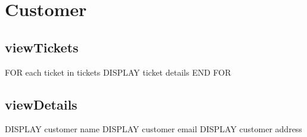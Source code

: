 \section{Customer}

\subsection{viewTickets}
\begin{pc}
FOR each ticket in tickets
	DISPLAY ticket details
END FOR
\end{pc}

\subsection{viewDetails}
\begin{pc}
DISPLAY customer name
DISPLAY customer email
DISPLAY customer address
\end{pc}
